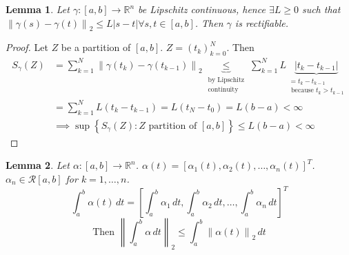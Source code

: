 \documentclass{article}
\newtheorem{lemma}{Lemma}  \numberwithin{lemma}{section}
\newcommand{\set}[1]{\left\{#1\right\}}
\newcommand{\norm}[1]{\left\|#1\right\|}
\newcommand{\card}[1]{\left|#1\right|}
\begin{document}
\begin{lemma} %
  Let $\gamma: [a, b] \to \mathbb R^n$ be Lipschitz continuous, hence $\exists L \geq 0$ such that $\norm{\gamma(s) - \gamma(t)}_2 \leq L \card{s - t} \forall s, t \in [a,b]$. Then $\gamma$ is rectifiable.
\end{lemma}

\begin{proof}
  Let $Z$ be a partition of $[a,b]$. $Z = (t_k)_{k=0}^N$. Then
  \begin{align*}
    S_{\gamma}(Z) &= \sum_{k=1}^N \norm{\gamma(t_k) - \gamma(t_{k-1})}_2 \underbrace{\leq}_{\substack{\text{by Lipschitz} \\ \text{continuity}}} \sum_{k=1}^N L \underbrace{\card{t_k - t_{k-1}}}_{\substack{= t_k - t_{k-1} \\ \text{ because } t_k > t_{k-1}}} \\
                  &= \sum_{k=1}^N L(t_k - t_{k-1}) = L(t_N - t_0) = L(b - a) < \infty \\
                  &\implies \sup\set{S_{\gamma}(Z): Z \text{ partition of } [a,b]} \leq L(b - a) < \infty
  \end{align*}
\end{proof}

\begin{lemma} %
  \label{lemma-2}
  Let $\alpha: [a,b] \to \mathbb R^n$. $\alpha(t) = \left[\alpha_1(t), \alpha_2(t), \dots, \alpha_n(t)\right]^T$.
  $\alpha_n \in \mathcal R[a,b]$ for $k = 1, \dots, n$.
  \[ \int_a^b \alpha(t) \, dt = \left[\int_a^b \alpha_1 \, dt, \int_a^b \alpha_2 \, dt, \dots, \int_a^b \alpha_n \, dt\right]^T \]
  \[ \text{Then } \norm{\int_a^b \alpha \, dt}_2 \leq \int_a^b \norm{\alpha(t)}_2 \, dt \]
\end{lemma}
\end{document}
